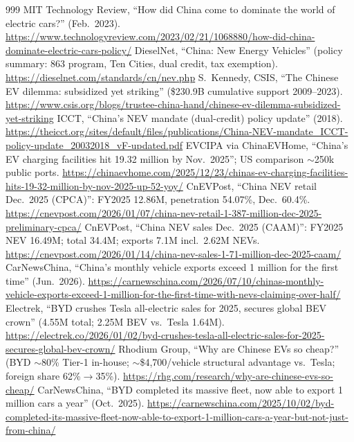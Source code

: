 \begin{thebibliography}{999}
 MIT Technology Review, ``How did China come to dominate the world of electric cars?'' (Feb.\ 2023). \url{https://www.technologyreview.com/2023/02/21/1068880/how-did-china-dominate-electric-cars-policy/}
 DieselNet, ``China: New Energy Vehicles'' (policy summary: 863 program, Ten Cities, dual credit, tax exemption). \url{https://dieselnet.com/standards/cn/nev.php}
 S.~Kennedy, CSIS, ``The Chinese EV dilemma: subsidized yet striking'' (\$230.9B cumulative support 2009--2023). \url{https://www.csis.org/blogs/trustee-china-hand/chinese-ev-dilemma-subsidized-yet-striking}
 ICCT, ``China's NEV mandate (dual-credit) policy update'' (2018). \url{https://theicct.org/sites/default/files/publications/China-NEV-mandate_ICCT-policy-update_20032018_vF-updated.pdf}
 EVCIPA via ChinaEVHome, ``China's EV charging facilities hit 19.32 million by Nov.\ 2025''; US comparison $\sim$250k public ports. \url{https://chinaevhome.com/2025/12/23/chinas-ev-charging-facilities-hits-19-32-million-by-nov-2025-up-52-yoy/}
 CnEVPost, ``China NEV retail Dec.\ 2025 (CPCA)'': FY2025 12.86M, penetration 54.07\%, Dec.\ 60.4\%. \url{https://cnevpost.com/2026/01/07/china-nev-retail-1-387-million-dec-2025-preliminary-cpca/}
 CnEVPost, ``China NEV sales Dec.\ 2025 (CAAM)'': FY2025 NEV 16.49M; total 34.4M; exports 7.1M incl.\ 2.62M NEVs. \url{https://cnevpost.com/2026/01/14/china-nev-sales-1-71-million-dec-2025-caam/}
 CarNewsChina, ``China's monthly vehicle exports exceed 1 million for the first time'' (Jun.\ 2026). \url{https://carnewschina.com/2026/07/10/chinas-monthly-vehicle-exports-exceed-1-million-for-the-first-time-with-nevs-claiming-over-half/}
 Electrek, ``BYD crushes Tesla all-electric sales for 2025, secures global BEV crown'' (4.55M total; 2.25M BEV vs.\ Tesla 1.64M). \url{https://electrek.co/2026/01/02/byd-crushes-tesla-all-electric-sales-for-2025-secures-global-bev-crown/}
 Rhodium Group, ``Why are Chinese EVs so cheap?'' (BYD $\sim$80\% Tier-1 in-house; $\sim$\$4,700/vehicle structural advantage vs.\ Tesla; foreign share 62\%$\rightarrow$35\%). \url{https://rhg.com/research/why-are-chinese-evs-so-cheap/}
 CarNewsChina, ``BYD completed its massive fleet, now able to export 1 million cars a year'' (Oct.\ 2025). \url{https://carnewschina.com/2025/10/02/byd-completed-its-massive-fleet-now-able-to-export-1-million-cars-a-year-but-not-just-from-china/}

\end{thebibliography}
